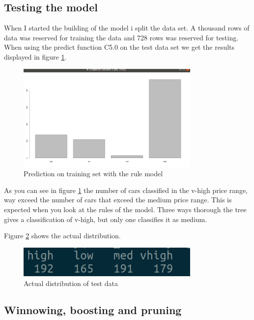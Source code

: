 \documentclass[a4paper, 12pt]{article}
\begin{document}
  \subsection{Testing the model}
  When I started the building of the model i split the data set. A thousand rows of data was reserved for training the data and 728 rows was reserved for testing. When using the predict function C5.0 on the test data set we get the results displayed in figure \ref{fig:predict}.

  \begin{figure}[h]
    \centering 
    \includegraphics[width=0.8\textwidth]
    {images/predict}
    \caption{Prediction on training set with the rule model}
    \label{fig:predict}
  \end{figure}

  As you can see in figure \ref{fig:predict} the number of cars classified in the v-high price range, way exceed the number of cars that exceed the medium price range. This is expected when you look at the rules of the model. Three ways thorough the tree gives a classification of v-high, but only one classifies it as medium.

  Figure \ref{fig:act} shows the actual distribution.

  \begin{figure}[h]
    \centering 
    \includegraphics[width=0.8\textwidth]
    {images/actual}
    \caption{Actual distribution of test data}
    \label{fig:act}
  \end{figure}

\subsection{Winnowing, boosting and pruning}
\end{document}
